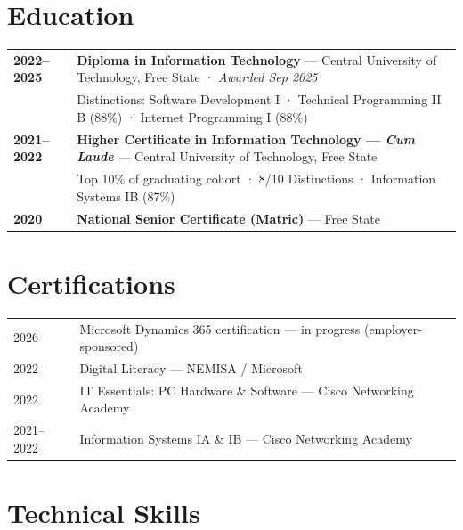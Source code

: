 \documentclass[a4paper,10.5pt]{article}
\begin{document}
\section{Education}

\vspace{5pt}
\begin{tabularx}{\linewidth}{@{}l X@{}}
  \textbf{2022--2025} & \textbf{Diploma in Information Technology} --- Central University of Technology, Free State · \textit{Awarded Sep 2025} \\[2pt]
                     & \small Distinctions: Software Development I · Technical Programming II B (88\%) · Internet Programming I (88\%) \\[6pt]
  \textbf{2021--2022} & \textbf{Higher Certificate in Information Technology --- \textit{Cum Laude}} --- Central University of Technology, Free State \\[2pt]
                     & \small Top 10\% of graduating cohort · 8/10 Distinctions · Information Systems IB (87\%) \\[6pt]
  \textbf{2020}      & \textbf{National Senior Certificate (Matric)} --- Free State \\
\end{tabularx}

\section{Certifications}

\vspace{5pt}
\begin{tabularx}{\linewidth}{@{}l X@{}}
  2026       & Microsoft Dynamics 365 certification --- in progress (employer-sponsored) \\[2pt]
  2022       & Digital Literacy --- NEMISA / Microsoft \\[2pt]
  2022       & IT Essentials: PC Hardware \& Software --- Cisco Networking Academy \\[2pt]
  2021--2022 & Information Systems IA \& IB --- Cisco Networking Academy \\
\end{tabularx}

\section{Technical Skills}
\end{document}
